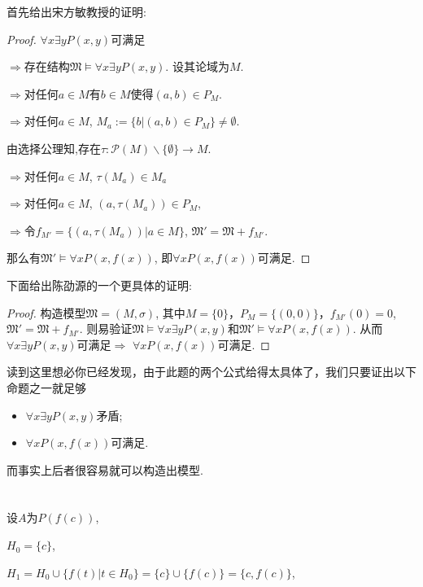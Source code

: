 \documentclass{article}
\begin{document}
首先给出宋方敏教授的证明:
\begin{proof}
$ \forall x \exists y  P(x, y) $可满足

$\Rightarrow$存在结构$\mathfrak{M} \models \forall x \exists y P(x, y)$. 设其论域为$M$. 

$\Rightarrow$对任何$a \in M$有$b \in M$使得$(a, b) \in P_M$. 

$\Rightarrow$对任何$a\in M$, $M_a := \{b|(a, b)\in P_M\} \neq \emptyset$.

由选择公理知,存在$\tau : \mathcal{P} (M) \backslash \{\emptyset\} \rightarrow M$. 



$\Rightarrow$对任何$a\in M$, $\tau(M_a) \in M_a$ 

$\Rightarrow$对任何$a\in M$, $(a,\tau(M_a)) \in P_M$, 

$\Rightarrow$令$f_{M'}=\{(a,\tau(M_a))|a \in M\}$, $\mathfrak{M'} = \mathfrak{M} +f_{M'}$.

那么有$\mathfrak{M'} \vDash \forall x P(x, f(x))$,
即$\forall x P(x, f(x))$可满足. 

\end{proof}

下面给出陈劭源的一个更具体的证明: 
\begin{proof}
	构造模型$\mathfrak{M} = (M, \sigma)$, 其中$M = \{0\}$，$P_M = \{(0, 0)\}$，$f_{M'}(0) = 0$, $\mathfrak{M'} = \mathfrak{M} + f_{M'}$. 则易验证$\mathfrak{M} \models \forall x \exists y P(x, y)$和$\mathfrak{M'} \models \forall x P(x, f(x))$. 从而$\forall x \exists y P(x, y)$可满足$\Rightarrow$ $\forall x P(x, f(x))$可满足. 
\end{proof}

读到这里想必你已经发现，由于此题的两个公式给得太具体了，我们只要证出以下命题之一就足够

\begin{itemize}
	\item $\forall x \exists y P(x, y)$矛盾; 
	\item $\forall x P(x, f(x))$可满足. 
\end{itemize}

而事实上后者很容易就可以构造出模型. 

\section{}

设$A$为$P(f(c))$,

$H_0=\{c\}$,

$H_1= H_0 \cup \{f(t)|t\in H_0\}= \{c\}\cup \{f(c)\} =\{c, f(c)\}$,
\end{document}
